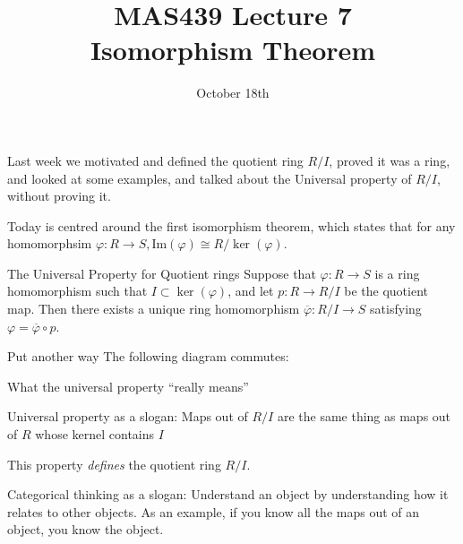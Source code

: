 \documentclass{beamer}
\title{MAS439 Lecture 7 \\ Isomorphism Theorem}
\date{October 18th}
\begin{document}
\begin{frame}
\titlepage
\end{frame}


\begin{frame}{}
Last week we motivated and defined the quotient ring $R/I$, proved it was a ring, and looked at some examples, and talked about the Universal property of $R/I$, without proving it.

Today is centred around the first isomorphism theorem, which states that for any homomorphsim $\varphi:R\to S, \textrm{Im}(\varphi)\cong R/\ker(\varphi)$. 

\end{frame}

\begin{frame}[fragile]{The Universal Property for Quotient rings}
Suppose that $\varphi:R \to S$ is a ring homomorphism such that $I\subset \ker(\varphi)$, and let $p:R\to R/I$ be the quotient map.   Then there exists a unique ring homomorphism $\overline{\varphi}:R/I\to S$ satisfying $\varphi=\overline{\varphi}\circ p$.

\begin{block}{Put another way}
The following diagram commutes:
\begin{center}
\end{center}
\end{block}

\end{frame}

\begin{frame}{What the universal property ``really means''}
\begin{block}{Universal property as a slogan:}
Maps out of $R/I$ are the same thing as maps out of $R$ whose kernel contains $I$
\end{block}

This property \emph{defines} the quotient ring $R/I$.

\begin{block}{Categorical thinking as a slogan:}
Understand an object by understanding how it relates to other objects.  As an example, if you know all the maps out of an object, you know the object.
\end{block}
\end{frame}
\end{document}
